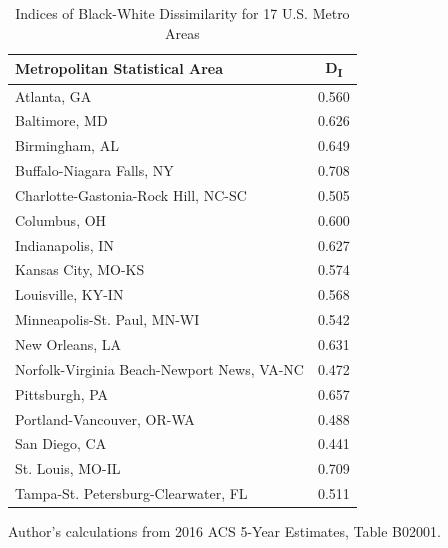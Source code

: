 \documentclass[paper=letter, fontsize=12pt]{scrartcl} %
\begin{document}
\begin{table}[h]
	\caption{Indices of Black-White Dissimilarity for 17 U.S. Metro Areas}
	\begin{center}
		\begin{tabular}{||l | c||}
			\hline
			\textbf{Metropolitan Statistical Area} & \textbf{D\textsubscript{I}} \\
			\hline \hline
			Atlanta, GA & 0.560 \\
			\hline
			Baltimore, MD & 0.626 \\
			\hline
			Birmingham, AL & 0.649 \\
			\hline
			Buffalo-Niagara Falls, NY & 0.708 \\
			\hline
			Charlotte-Gastonia-Rock Hill, NC-SC & 0.505 \\
			\hline
			Columbus, OH & 0.600 \\
			\hline
			Indianapolis, IN & 0.627 \\
			\hline
			Kansas City, MO-KS & 0.574 \\
			\hline
			Louisville, KY-IN & 0.568 \\
			\hline
			Minneapolis-St. Paul, MN-WI & 0.542 \\
			\hline
			New Orleans, LA & 0.631 \\
			\hline
			Norfolk-Virginia Beach-Newport News, VA-NC & 0.472 \\
			\hline
			Pittsburgh, PA & 0.657 \\
			\hline
			Portland-Vancouver, OR-WA & 0.488 \\
			\hline
			San Diego, CA & 0.441 \\
			\hline
			St. Louis, MO-IL & 0.709 \\
			\hline
			Tampa-St. Petersburg-Clearwater, FL & 0.511 \\
			\hline
		\end{tabular}
	\end{center}
Author's calculations from 2016 ACS 5-Year Estimates, Table B02001.
\end{table}
\end{document}
